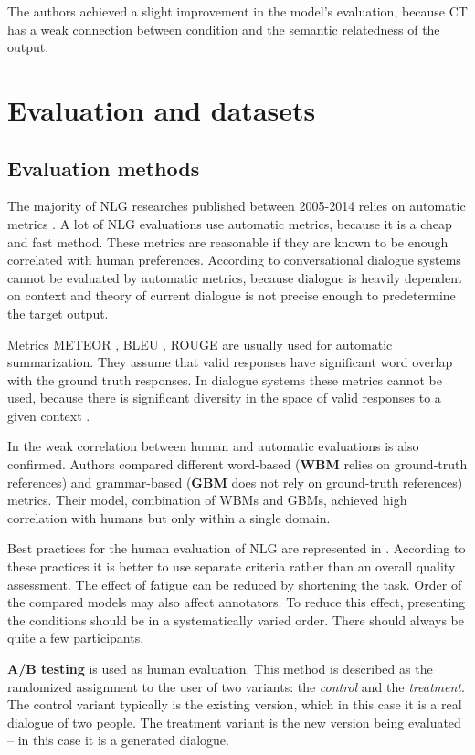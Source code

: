 The authors achieved a slight improvement in the model's evaluation, because CT has a weak connection between condition and the semantic relatedness of the output.
 
\chapter{Evaluation and datasets} \label{eval_datasets_section}
\section{Evaluation methods}\label{eval}
The majority of NLG researches published between 2005-2014 relies on automatic metrics \cite{gkatzia2015snapshot}. A lot of NLG evaluations use automatic metrics, because it is a cheap and fast method. These metrics are reasonable if they are known to be enough correlated with human preferences. According to \cite{artstein2009semi} conversational dialogue systems cannot be evaluated by automatic metrics, because dialogue is heavily dependent on context and theory of current dialogue is not precise enough to predetermine the target output.  

Metrics METEOR \cite{banerjee2005meteor}, BLEU \cite{papineni2002bleu}, ROUGE \cite{lin2004rouge} are usually used for automatic summarization. They assume that valid responses have significant word overlap with the ground truth responses. In dialogue systems these metrics cannot be used, because there is significant diversity in the space of valid responses to a given context \cite{liu2016not}.

In \cite{novikova2017we} the weak correlation between human and automatic evaluations is also confirmed. Authors compared different word-based (\textbf{WBM} relies on ground-truth references) and grammar-based (\textbf{GBM} does not rely on ground-truth references) metrics. Their model, combination of WBMs and GBMs, achieved high correlation with humans but only within a single domain.

Best practices for the human evaluation of NLG are represented in \cite{van2019best}. According to these practices it is better to use separate criteria rather than an overall quality assessment. The effect of fatigue can be reduced by shortening the task. Order of the compared models may also affect annotators. To reduce this effect, presenting the conditions should be in a systematically varied order. There should always be quite a few participants.

\textbf{A/B testing} \cite{kohavi2017online} is used as human evaluation. This method is described as the randomized assignment to the user of two variants: the \textit{control} and the \textit{treatment}. The control variant typically is the existing version, which in this case it is a real dialogue of two people. The treatment variant is the new version being evaluated -- in this case it is a generated dialogue. 

